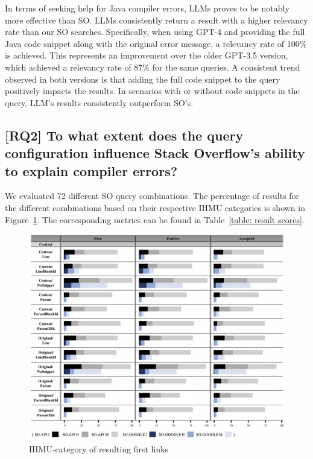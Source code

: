 \documentclass[preprint,12pt]{elsarticle}
\begin{document}
In terms of seeking help for Java compiler errors, LLMs proves to be notably more effective than SO. LLMs consistently return a result with a higher relevancy rate than our SO searches. Specifically, when using GPT-4 and providing the full Java code snippet along with the original error message, a relevancy rate of 100\% is achieved. This represents an improvement over the older GPT-3.5 version, which achieved a relevancy rate of 87\% for the same queries. A consistent trend observed in both versions is that adding the full code snippet to the query positively impacts the results. In scenarios with or without code snippets in the query, LLM's results consistently outperform SO's.

\subsection*{\textbf{[RQ2] }To what extent does the query configuration influence Stack Overflow's ability to explain compiler errors?}

We evaluated 72 different SO query combinations. The percentage of results for the different combinations based on their respective IHMU categories is shown in Figure~\ref{fig: result stacked chart}. The corresponding metrics can be found in Table~\ref{table: result scores}.


\begin{figure}[h]
\centering
  \includegraphics[width = \linewidth]{Figures/NEW_result_stacked_chart.png}
  \caption{IHMU-category of resulting first links}
  \label{fig: result stacked chart}
  
\end{figure}
\end{document}
